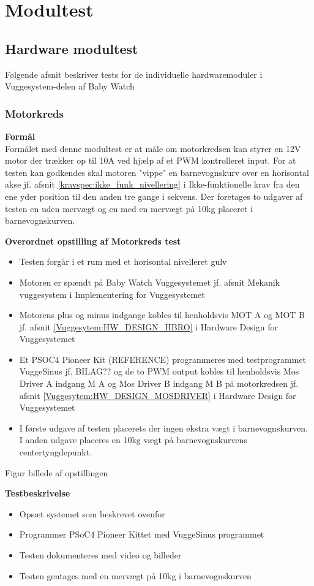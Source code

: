 \section{Modultest}
\subsection{Hardware modultest}
Følgende afsnit beskriver tests for de individuelle hardwaremoduler i Vuggesystem-delen af Baby Watch
\subsubsection{Motorkreds}
\textbf{Formål} \\
Formålet med denne modultest er at måle om motorkredsen kan styrer en 12V motor der trækker op til 10A ved hjælp af et PWM kontrolleret input. For at testen kan godkendes skal motoren "vippe" en barnevognskurv over en horisontal akse jf. afsnit \ref{kravspec:ikke_funk_nivellering} i Ikke-funktionelle krav fra den ene yder position til den anden tre gange i sekvens. Der foretages to udgaver af testen en uden mervægt og en med en mervægt på 10kg placeret i barnevognskurven.

\textbf{Overordnet opstilling af Motorkreds test}

\begin{itemize}
	\item Testen forgår i et rum med et horisontal nivelleret gulv
	\item Motoren er spændt på Baby Watch Vuggesystemet jf. afsnit Mekanik vuggesystem i Implementering for Vuggesystemet
	\item Motorens plus og minus indgange kobles til henholdsvis MOT A og MOT B jf. afsnit \ref{Vuggesytem:HW_DESIGN_HBRO} i Hardware Design for Vuggesystemet
	\item Et PSOC4 Pioneer Kit (REFERENCE) programmeres med testprogrammet VuggeSinus jf. BILAG?? og de to PWM output kobles til henholdsvis Mos Driver A indgang M A og Mos Driver B indgang M B på motorkredsen jf. afsnit \ref{Vuggesytem:HW_DESIGN_MOSDRIVER} i Hardware Design for Vuggesystemet
	\item I første udgave af testen placerets der ingen ekstra vægt i barnevognskurven. I anden udgave placeres en 10kg vægt på barnevognskurvens centertyngdepunkt.
\end{itemize}

Figur billede af opstillingen

\textbf{Testbeskrivelse}
\begin{itemize}
	\item Opsæt systemet som beskrevet ovenfor
	\item Programmer PSoC4 Pioneer Kittet med VuggeSinus programmet
	\item Testen dokumenteres med video og billeder
	\item Testen gentages med en mervægt på 10kg i barnevognskurven
\end{itemize}

